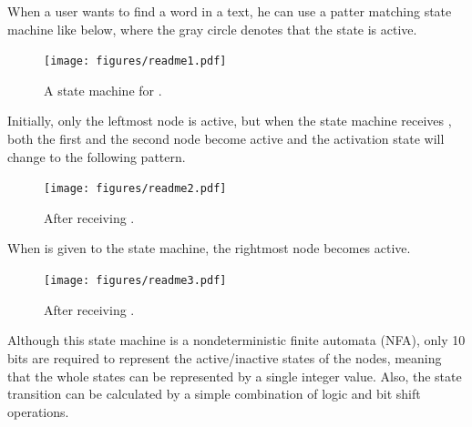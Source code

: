 \documentclass{sigchi}
\begin{document}
When a user wants to find a word  in a text,
he can use a patter matching state machine like below,
where the gray circle denotes that the state is active.

\begin{figure}[h]
  \texttt{[image: figures/readme1.pdf]}
  \caption{A state machine for .}
  \label{readme1}
\end{figure}

Initially, only the leftmost node is active, but when the
state machine receives , both the first and the second node become active
and the activation state will change to the following pattern.

\begin{figure}[h]
\texttt{[image: figures/readme2.pdf]}
\caption{After receiving .}
\label{readme2}
\end{figure}

When  is given to the state machine,
the rightmost node becomes active.

\begin{figure}[h]
\texttt{[image: figures/readme3.pdf]}
\caption{After receiving .}
\label{readme3}
\end{figure}

Although this state machine is a nondeterministic finite automata (NFA),
only 10 bits are required to represent the active/inactive states of the nodes,
meaning that the whole states can be represented by a single integer value.
Also,
the state transition can be calculated by a simple combination of
logic and bit shift operations.
\end{document}
